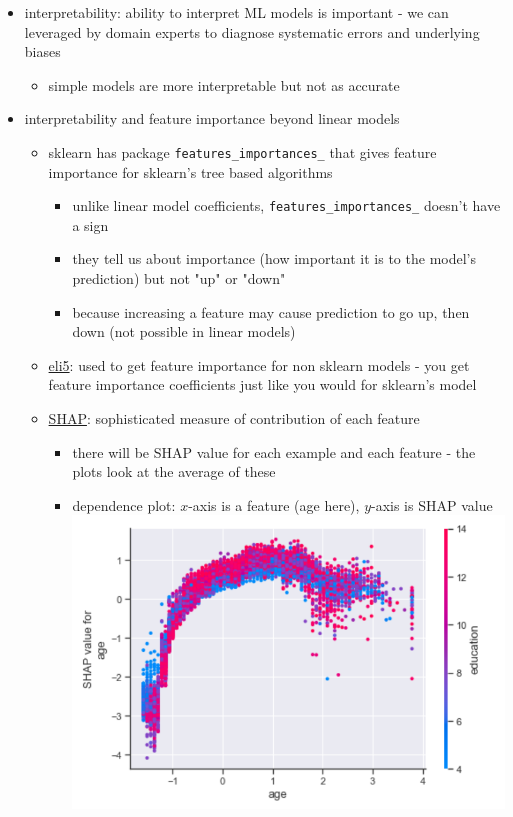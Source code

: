 \documentclass[10.5pt,a4paper, fleqn, dvipsnames]{article}
\begin{document}
\begin{itemize}
\begin{itemize}
    \end{itemize}
    \item interpretability: ability to interpret ML models is important - we can leveraged by domain experts to diagnose systematic errors and underlying biases
    \begin{itemize}
        \item simple models are more interpretable but not as accurate 
    \end{itemize}
    \item interpretability and feature importance beyond linear models
    \begin{itemize}
        \item sklearn has package \lstinline{features_importances_} that gives feature importance for sklearn's tree based algorithms  
        \begin{itemize}[leftmargin = 2em]
            \item unlike linear model coefficients, \lstinline{features_importances_} doesn't have a sign 
            \item they tell us about importance (how important it is to the model's prediction) but not "up" or "down"
            \item because increasing a feature may cause prediction to go up, then down (not possible in linear models)
        \end{itemize}
        \item \ul{eli5}: used to get feature importance for non sklearn models - you get feature importance coefficients just like you would for sklearn's model
        \item \ul{SHAP}: sophisticated measure of contribution of each feature 
        \begin{itemize}[leftmargin = 2em]
            \item there will be SHAP value for each example and each feature - the plots look at the average of these
            \item dependence plot: $x$-axis is a feature (age here), $y$-axis is SHAP value\\
            \includegraphics[scale = 0.7]{shap-dependence-plot.png}

\end{itemize}
\end{itemize}
\end{itemize}
\end{document}
